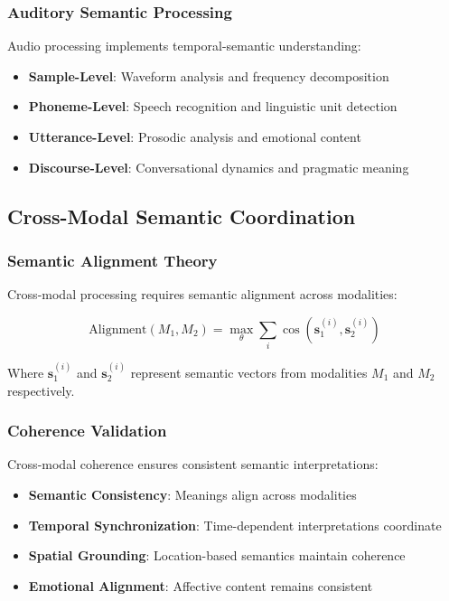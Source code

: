 \documentclass[12pt,a4paper,twoside]{article}
\begin{document}
\subsubsection{Auditory Semantic Processing}

Audio processing implements temporal-semantic understanding:

\begin{itemize}
\item \textbf{Sample-Level}: Waveform analysis and frequency decomposition
\item \textbf{Phoneme-Level}: Speech recognition and linguistic unit detection
\item \textbf{Utterance-Level}: Prosodic analysis and emotional content
\item \textbf{Discourse-Level}: Conversational dynamics and pragmatic meaning
\end{itemize}

\subsection{Cross-Modal Semantic Coordination}

\subsubsection{Semantic Alignment Theory}

Cross-modal processing requires semantic alignment across modalities:

\begin{equation}
\text{Alignment}(M_1, M_2) = \max_{\theta} \sum_{i} \cos(\mathbf{s}_1^{(i)}, \mathbf{s}_2^{(i)})
\end{equation}

Where $\mathbf{s}_1^{(i)}$ and $\mathbf{s}_2^{(i)}$ represent semantic vectors from modalities $M_1$ and $M_2$ respectively.

\subsubsection{Coherence Validation}

Cross-modal coherence ensures consistent semantic interpretations:

\begin{itemize}
\item \textbf{Semantic Consistency}: Meanings align across modalities
\item \textbf{Temporal Synchronization}: Time-dependent interpretations coordinate
\item \textbf{Spatial Grounding}: Location-based semantics maintain coherence
\item \textbf{Emotional Alignment}: Affective content remains consistent
\end{itemize}
\end{document}
